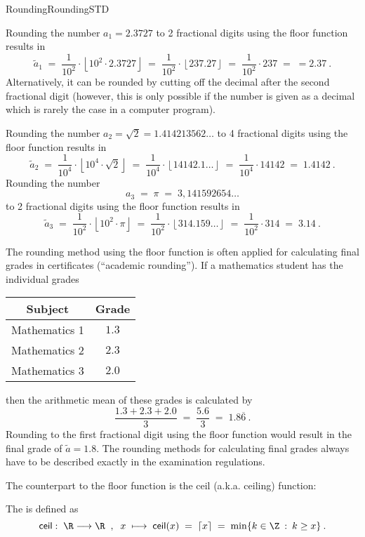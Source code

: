 \begin{MXContent}{Rounding}{Rounding}{STD}
\begin{MExample}
Rounding the number $a_1=2.3727$ to 2 fractional digits using the \textsf{floor} function results in
$$
\tilde a_1 \;=\; \frac1{10^2}\cdot \left\lfloor{10^2\cdot2.3727}\right\rfloor\; =\; \frac1{10^2}\cdot \left\lfloor{ 237.27}\right\rfloor \;=\; \frac1{10^2}\cdot 237\;=\; =2.37\: .
$$
Alternatively, it can be rounded by cutting off the decimal after the second fractional digit 
(however, this is only possible if the number is given as a decimal which is rarely the case in a computer program).


Rounding the number $a_2=\sqrt{2}=1.414213562\ldots$ to 4 fractional digits using the \textsf{floor} function results in
$$
\tilde a_2 \;=\; \frac1{10^4}\cdot \left\lfloor{ 10^4\cdot \sqrt2}\right\rfloor \;=\; \frac1{10^4}\cdot \left\lfloor{ 14142.1\ldots}\right\rfloor\;=\; \frac1{10^4}\cdot 14142 \;=\; 1.4142\: .
$$
Rounding the number
$$
a_3 \;=\; \pi \;=\; 3,141592654\ldots
$$
to 2 fractional digits using the \textsf{floor} function results in
$$
\tilde a_3 \;=\; \frac1{10^2}\cdot \left\lfloor{ 10^2\cdot\pi}\right\rfloor\;=\; \frac1{10^2}\cdot \left\lfloor{ 314.159\ldots}\right\rfloor \;=\; \frac1{10^2}\cdot 314 \;=\; 3.14\: .
$$
\end{MExample}

The rounding method using the \textsf{floor} function is often applied for calculating final grades in certificates 
(``academic rounding''). If a mathematics student has the individual grades
\begin{center}
\begin{tabular}{|c|c|}
\hline
Subject & Grade \\ \hline
Mathematics 1 & $1.3$ \\ 
Mathematics 2 & $2.3$ \\ 
Mathematics 3 & $2.0$ \\ \hline
\end{tabular}
\end{center}
then the arithmetic mean of these grades is calculated by 
$$
\frac{1.3 + 2.3 + 2.0}{3}\; =\; \frac{5.6}{3} \; =\; 1.8\overline{6}\: .
$$
Rounding to the first fractional digit using the \textsf{floor} function would result in the final 
grade of $\tilde a=1.8$. The rounding methods for calculating final grades always have to be described exactly 
in the examination regulations.

The counterpart to the \textsf{floor} function is the \textsf{ceil} (a.k.a. ceiling) function:

\begin{MInfo}
The  is defined as
$$
\textsf{ceil}:\; \R\longrightarrow\R\;\; , \;\;
x\;\longmapsto\; \textsf{ceil}(x)\;=\; \left\lceil{ x}\right\rceil\;=\; \min\lbrace k\in\Z\: :\: k\geq x\rbrace\: .
$$
\end{MInfo}


\end{MXContent}

